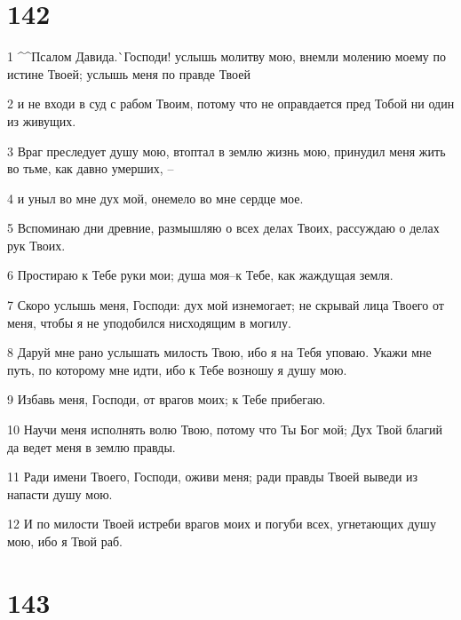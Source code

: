 \chapter{142}

\par 1 ^^Псалом Давида.^^ Господи! услышь молитву мою, внемли молению моему по истине Твоей; услышь меня по правде Твоей
\par 2 и не входи в суд с рабом Твоим, потому что не оправдается пред Тобой ни один из живущих.
\par 3 Враг преследует душу мою, втоптал в землю жизнь мою, принудил меня жить во тьме, как давно умерших, --
\par 4 и уныл во мне дух мой, онемело во мне сердце мое.
\par 5 Вспоминаю дни древние, размышляю о всех делах Твоих, рассуждаю о делах рук Твоих.
\par 6 Простираю к Тебе руки мои; душа моя--к Тебе, как жаждущая земля.
\par 7 Скоро услышь меня, Господи: дух мой изнемогает; не скрывай лица Твоего от меня, чтобы я не уподобился нисходящим в могилу.
\par 8 Даруй мне рано услышать милость Твою, ибо я на Тебя уповаю. Укажи мне путь, по которому мне идти, ибо к Тебе возношу я душу мою.
\par 9 Избавь меня, Господи, от врагов моих; к Тебе прибегаю.
\par 10 Научи меня исполнять волю Твою, потому что Ты Бог мой; Дух Твой благий да ведет меня в землю правды.
\par 11 Ради имени Твоего, Господи, оживи меня; ради правды Твоей выведи из напасти душу мою.
\par 12 И по милости Твоей истреби врагов моих и погуби всех, угнетающих душу мою, ибо я Твой раб.

\chapter{143}

